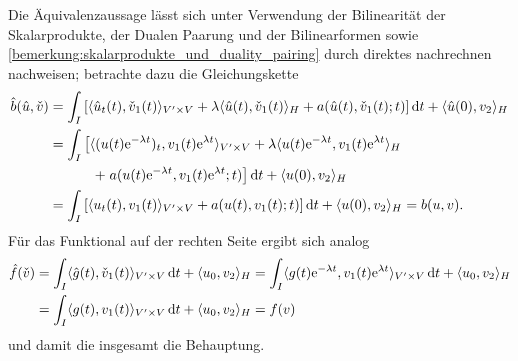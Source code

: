\documentclass[../main.tex]{subfiles}
\begin{document}
\begin{Proposition}
\begin{Beweis}
        Die Äquivalenzaussage lässt sich unter Verwendung der Bilinearität der Skalarprodukte, der Dualen Paarung und der Bilinearformen sowie \cref{bemerkung:skalarprodukte_und_duality_pairing} durch direktes nachrechnen nachweisen; betrachte dazu die Gleichungskette
        \begin{equation}
            \begin{aligned}
                \hat{b}(\hat{u}, \check{v})
                &= \int_{I} \left[ \langle\hat{u}_{t}(t),\check{v}_{1}(t)\rangle_{V' \times V} + \lambda \langle\hat{u}(t),\check{v}_{1}(t)\rangle_{H} + a(\hat{u}(t), \check{v}_{1}(t); t) \right] \mathop{}\!\mathrm{d} t + \langle\hat{u}(0),v_{2}\rangle_{H}
                \\
                &= \int_{I} \left[ \langle(u(t)\mathrm{e}^{- \lambda t})_{t},v_{1}(t) \mathrm{e}^{\lambda t}\rangle_{V' \times V} + \lambda \langle u(t)\mathrm{e}^{- \lambda t},v_{1}(t)\mathrm{e}^{\lambda t}\rangle_{H} \right.
                \\&\qquad \quad
                \left. +\;a(u(t)\mathrm{e}^{- \lambda t}, v_{1}(t)\mathrm{e}^{\lambda t}; t) \right] \mathop{}\!\mathrm{d} t + \langle u(0),v_{2}\rangle_{H}
                \\
                &= \int_{I} \left[ \langle u_{t}(t),v_{1}(t)\rangle_{V' \times V} + a(u(t), v_{1}(t); t) \right] \mathop{}\!\mathrm{d} t + \langle u(0),v_{2}\rangle_{H}
                = b(u, v).
            \end{aligned}
        \end{equation}
        Für das Funktional auf der rechten Seite ergibt sich analog
        \begin{equation}
            \begin{aligned}
                \hat{f}(\check{v})
                &= \int_{I} \langle\hat{g}(t),\check{v}_{1}(t)\rangle_{V' \times V} \mathop{}\!\mathrm{d} t + \langle u_{0},v_{2}\rangle_{H}
                = \int_{I} \langle g(t)\mathrm{e}^{- \lambda t},v_{1}(t)\mathrm{e}^{\lambda t}\rangle_{V' \times V} \mathop{}\!\mathrm{d} t + \langle u_{0},v_{2}\rangle_{H}
                \\&= \int_{I} \langle g(t),v_{1}(t)\rangle_{V' \times V} \mathop{}\!\mathrm{d} t + \langle u_{0},v_{2}\rangle_{H}
                = f(v)
            \end{aligned}
        \end{equation}
        und damit die insgesamt die Behauptung.
    \end{Beweis}
\end{Proposition}
\end{document}
